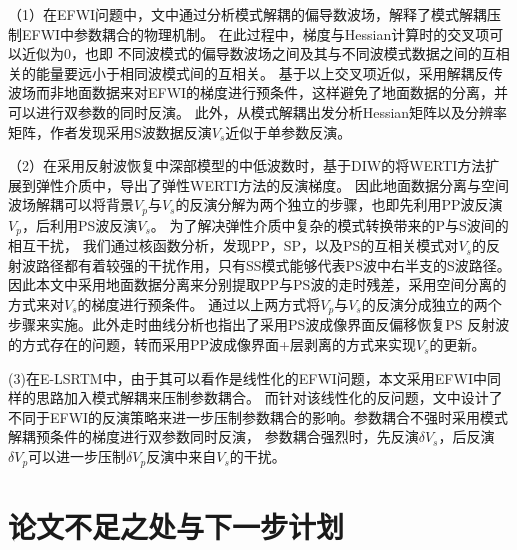 （1）在EFWI问题中，文中通过分析模式解耦的偏导数波场，解释了模式解耦压制EFWI中参数耦合的物理机制。
在此过程中，梯度与Hessian计算时的交叉项可以近似为0，也即
不同波模式的偏导数波场之间及其与不同波模式数据之间的互相关的能量要远小于相同波模式间的互相关。
基于以上交叉项近似，采用解耦反传波场而非地面数据来对EFWI的梯度进行预条件，这样避免了地面数据的分离，并可以进行双参数的同时反演。
此外，从模式解耦出发分析Hessian矩阵以及分辨率矩阵，作者发现采用S波数据反演$V_s$近似于单参数反演。

（2）在采用反射波恢复中深部模型的中低波数时，基于DIW的将WERTI方法扩展到弹性介质中，导出了弹性WERTI方法的反演梯度。
因此地面数据分离与空间波场解耦可以将背景$V_p$与$V_s$的反演分解为两个独立的步骤，也即先利用PP波反演$V_p$，后利用PS波反演$V_s$。
为了解决弹性介质中复杂的模式转换带来的P与S波间的相互干扰，
我们通过核函数分析，发现PP，SP，以及PS的互相关模式对$V_s$的反射波路径都有着较强的干扰作用，只有SS模式能够代表PS波中右半支的S波路径。
因此本文中采用地面数据分离来分别提取PP与PS波的走时残差，采用空间分离的方式来对$V_s$的梯度进行预条件。
通过以上两方式将$V_p$与$V_s$的反演分成独立的两个步骤来实施。此外走时曲线分析也指出了采用PS波成像界面反偏移恢复PS
反射波的方式存在的问题，转而采用PP波成像界面+层剥离的方式来实现$V_s$的更新。

(3)在E-LSRTM中，由于其可以看作是线性化的EFWI问题，本文采用EFWI中同样的思路加入模式解耦来压制参数耦合。
而针对该线性化的反问题，文中设计了不同于EFWI的反演策略来进一步压制参数耦合的影响。参数耦合不强时采用模式解耦预条件的梯度进行双参数同时反演，
参数耦合强烈时，先反演$\delta V_s$，后反演$\delta V_p$可以进一步压制$\delta
V_p$反演中来自$V_s$的干扰。

\section{论文不足之处与下一步计划}

